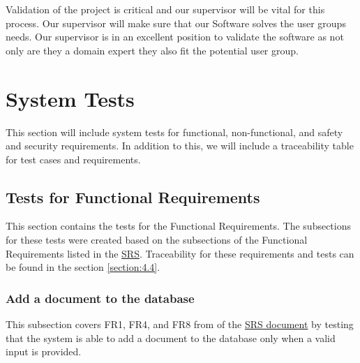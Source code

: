 \documentclass[12pt, titlepage]{article}
\begin{document}
Validation of the project is critical and our supervisor will be vital for this process. Our supervisor will make sure that our Software solves the user groups needs. Our supervisor is in an excellent position to validate the software as not only are they a domain expert they also fit the potential user group.

\section{System Tests} \label{section:4}

This section will include system tests for functional, non-functional, and safety and security requirements. In addition to this, we will include a traceability table for test cases and requirements.

\subsection{Tests for Functional Requirements} \label{section:4.1}



This section contains the tests for the Functional Requirements. The subsections for these tests were created based on the subsections of the Functional Requirements listed in the \href{https://github.com/Inreet-Kaur/capstone/blob/main/docs/SRS/SRS.pdf}{SRS}. Traceability for these requirements and tests can be found in the section \ref{section:4.4}.


\subsubsection{Add a document to the database} \label{section:4.1.1}

This subsection covers FR1, FR4, and FR8 from of the \href{https://github.com/Inreet-Kaur/capstone/blob/main/docs/SRS/SRS.pdf}{SRS document} by testing that the system is able to add a document to the database only when a valid input is provided.
\end{document}

